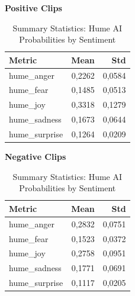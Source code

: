   
  \begin{table}[H]
    \centering
    \begin{subtable}{0.45\textwidth}
      \centering
      \caption*{\textbf{Positive Clips}}
      \begin{tabular}{lrr}
        \toprule
        \textbf{Metric}      & \textbf{Mean}  & \textbf{Std}   \\
        \midrule
        hume\_anger          & 0,2262         & 0,0584         \\
        hume\_fear           & 0,1485         & 0,0513         \\
        hume\_joy            & 0,3318         & 0,1279         \\
        hume\_sadness        & 0,1673         & 0,0644         \\
        hume\_surprise       & 0,1264         & 0,0209         \\
        \bottomrule
      \end{tabular}
    \end{subtable}\hfill
    \begin{subtable}{0.45\textwidth}
      \centering
      \caption*{\textbf{Negative Clips}}
      \begin{tabular}{lrr}
        \toprule
        \textbf{Metric}      & \textbf{Mean}  & \textbf{Std}   \\
        \midrule
        hume\_anger          & 0,2832         & 0,0751         \\
        hume\_fear           & 0,1523         & 0,0372         \\
        hume\_joy            & 0,2758         & 0,0951         \\
        hume\_sadness        & 0,1771         & 0,0691         \\
        hume\_surprise       & 0,1117         & 0,0205         \\
        \bottomrule
      \end{tabular}
    \end{subtable}
    \caption{Summary Statistics: Hume AI Probabilities by Sentiment}
    \label{tab:summary_hume_by_sentiment}
  \end{table}
  

